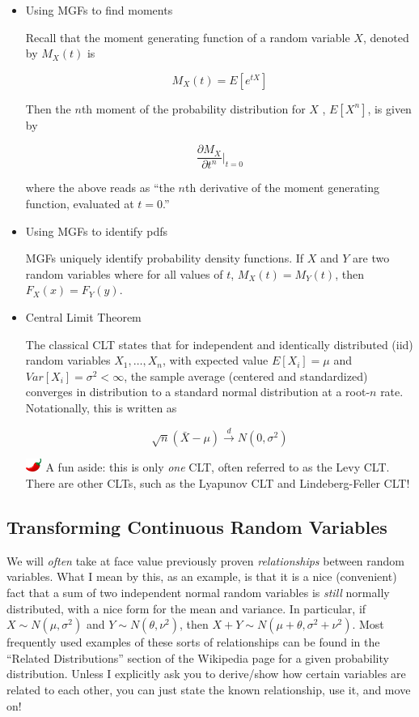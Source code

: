 \documentclass[
  letterpaper,
  DIV=11,
  numbers=noendperiod]{scrreprt}
\begin{document}
\begin{itemize}
\item
  Using MGFs to find moments

  Recall that the moment generating function of a random variable \(X\),
  denoted by \(M_X(t)\) is

  \[
  M_X(t) = E[e^{tX}]
  \]

  Then the \(n\)th moment of the probability distribution for \(X\) ,
  \(E[X^n]\), is given by

  \[
  \frac{\partial M_X}{\partial t^n} \Bigg|_{t = 0} 
  \]

  where the above reads as ``the \(n\)th derivative of the moment
  generating function, evaluated at \(t = 0\).''
\item
  Using MGFs to identify pdfs

  MGFs uniquely identify probability density functions. If \(X\) and
  \(Y\) are two random variables where for all values of \(t\),
  \(M_X(t) = M_Y(t)\), then \(F_X(x) = F_Y(y)\).
\item
  Central Limit Theorem

  The classical CLT states that for independent and identically
  distributed (iid) random variables \(X_1, \dots, X_n\), with expected
  value \(E[X_i] = \mu\) and \(Var[X_i] = \sigma^2 < \infty\), the
  sample average (centered and standardized) converges in distribution
  to a standard normal distribution at a root-\(n\) rate. Notationally,
  this is written as

  \[
  \sqrt{n} (\bar{X} - \mu) \overset{d}{\to} N(0, \sigma^2)
  \]

  \includegraphics[width=0.20833in,height=0.16667in]{images/chilipepper.png}
  A fun aside: this is only \emph{one} CLT, often referred to as the
  Levy CLT. There are other CLTs, such as the Lyapunov CLT and
  Lindeberg-Feller CLT!
\end{itemize}

\subsection{Transforming Continuous Random
Variables}\label{transforming-continuous-random-variables}

We will \emph{often} take at face value previously proven
\emph{relationships} between random variables. What I mean by this, as
an example, is that it is a nice (convenient) fact that a sum of two
independent normal random variables is \emph{still} normally
distributed, with a nice form for the mean and variance. In particular,
if \(X \sim N(\mu, \sigma^2)\) and \(Y \sim N(\theta, \nu^2)\), then
\(X + Y \sim N(\mu + \theta, \sigma^2 + \nu^2)\). Most frequently used
examples of these sorts of relationships can be found in the ``Related
Distributions'' section of the Wikipedia page for a given probability
distribution. Unless I explicitly ask you to derive/show how certain
variables are related to each other, you can just state the known
relationship, use it, and move on!
\end{document}
